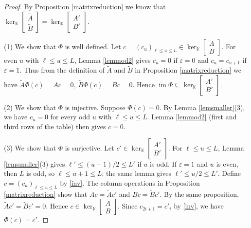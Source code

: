 \documentclass[11pt]{amsart}
\theoremstyle{remark}
\theoremstyle{definition}
\newcommand{\K}{\mathbb K}
\numberwithin{equation}{section}
\begin{document}
\begin{proof}
By Proposition \ref{matrixreduction} we know that
$
\ker_\K\begin{bmatrix}
	\widetilde A\\ \widetilde B
\end{bmatrix}
=
\ker_\K\begin{bmatrix}
	A'\\B'
\end{bmatrix}.
$

	(1) We show that $\Phi$ is well defined.
	Let $c=(c_u)_{\ell\le u\le L}\in
	\ker_\K\left[\begin{smallmatrix}A\\B\end{smallmatrix}\right]$. For even $u$ with $\ell\le u\le L$, Lemma \ref{lemmod2}
	gives $c_u=0$ if $\varepsilon=0$ and $c_u=c_{u+1}$
	if $\varepsilon=1$. Thus from the definition of $\widetilde A$ and $\widetilde B$ in
	Proposition \ref{matrixreduction} we have
$
	\widetilde A\Phi(c)=Ac=0,
	\
	\widetilde B\Phi(c)=Bc=0.
	$
	Hence
$
	\operatorname{im}\Phi\subseteq
	\ker_\K\left[\begin{smallmatrix}A'\\B'\end{smallmatrix}\right].
$

(2) We show that $\Phi$ is injective. Suppose $\Phi(c)=0$.
	By Lemma \ref{lemsmaller}(3), we have $c_u=0$ for every odd $u$
	with $\ell\le u\le L$.
	Lemma \ref{lemmod2} (first and third rows of the table) then gives $c=0$.

(3) We show that $\Phi$ is surjective.
	Let $c'\in\ker_\K\left[\begin{smallmatrix}A'\\B'\end{smallmatrix}\right]$.
For $\ell\le u\le L$, Lemma \ref{lemsmaller}(3) gives
$\ell'\le (u-1)/2\le L'$ if $u$ is odd.
If $\varepsilon=1$ and $u$ is even, then $L$ is odd,
so $\ell\le u+1\le L$; the same lemma gives
$\ell'\le u/2\le L'$.
Define $c=(c_u)_{\ell\le u\le L}$ by \eqref{inv}. The column operations in Proposition \ref{matrixreduction}
show that $Ac=\widetilde A c'$ and $Bc=\widetilde B c'$.
By the same proposition, $\widetilde A c'=\widetilde B c'=0$.
Hence $c\in\ker_\K\left[\begin{smallmatrix}A\\B\end{smallmatrix}\right]$.
Since $c_{2i+1}=c'_i$ by \eqref{inv}, we have $\Phi(c)=c'$.
\end{proof}
\end{document}

